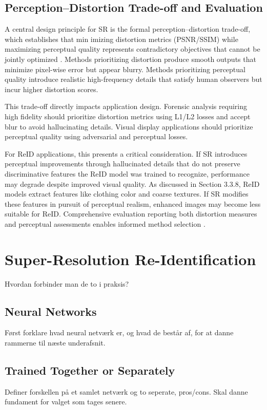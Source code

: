 \subsection{Perception–Distortion Trade-off and Evaluation}

A central design principle for SR is the formal perception–distortion trade-off, which establishes that min imizing distortion metrics (PSNR/SSIM) while maximizing perceptual quality represents contradictory objectives that cannot be jointly optimized \cite{Blau2018PerceptionDistortion}. Methods prioritizing distortion produce smooth outputs that minimize pixel-wise error but appear blurry. Methods prioritizing perceptual quality introduce realistic high-frequency details that satisfy human observers but incur higher distortion scores.

This trade-off directly impacts application design. Forensic analysis requiring high fidelity should prioritize distortion metrics using L1/L2 losses and accept blur to avoid hallucinating details. Visual display applications should prioritize perceptual quality using adversarial and perceptual losses.

For ReID applications, this presents a critical consideration. If SR introduces perceptual improvements through hallucinated details that do not preserve discriminative features the ReID model was trained to recognize, performance may degrade despite improved visual quality. As discussed in Section 3.3.8, ReID models extract features like clothing color and coarse textures. If SR modifies these features in pursuit of perceptual realism, enhanced images may become less suitable for ReID. Comprehensive evaluation reporting both distortion measures and perceptual assessments enables informed method selection \cite{Zhang2018LPIPS,Wang2004SSIM}.


\section{Super-Resolution Re-Identification}
Hvordan forbinder man de to i praksis?

\subsection{Neural Networks}
Først forklare hvad neural netværk er, og hvad de består af, for at danne rammerne til næste underafsnit.

\subsection{Trained Together or Separately}
Definer forskellen på et samlet netværk og to seperate, pros/cons. Skal danne fundament for valget som tages senere. 


